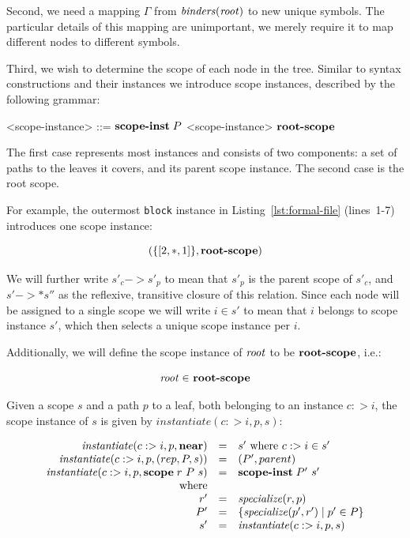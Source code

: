 \documentclass{kththesis}
\begin{document}
Second, we need a mapping $\Gamma$ from $\mathit{binders}(\mathit{root})$ to new unique symbols. The particular details of this mapping are unimportant, we merely require it to map different nodes to different symbols.

Third, we wish to determine the scope of each node in the tree. Similar to syntax constructions and their instances we introduce scope instances, described by the following grammar:

\newcommand{\rootscope}{\ensuremath{\mathrel{\text{\textbf{root-scope}}}}}
\newcommand{\scopeinst}{\mathrel{\text{\textbf{scope-inst}}}}

\begin{grammar}
<scope-instance> ::= $\scopeinst P$ <scope-instance>
  \alt \rootscope
\end{grammar}

The first case represents most instances and consists of two components: a set of paths to the leaves it covers, and its parent scope instance. The second case is the root scope.

For example, the outermost \texttt{block} instance in Listing~\ref{lst:formal-file} (lines~1-7) introduces one scope instance:

$$
(\{[2, *, 1]\}, \rootscope)
$$

We will further write $s'_c -> s'_p$ to mean that $s'_p$ is the parent scope of $s'_c$, and $s' ->* s''$ as the reflexive, transitive closure of this relation. Since each node will be assigned to a single scope we will write $i \in s'$ to mean that $i$ belongs to scope instance $s'$, which then selects a unique scope instance per $i$.

Additionally, we will define the scope instance of $\mathit{root}$ to be $\rootscope$, i.e.:

$$ \rooti \in\ \rootscope $$

\newcommand{\instantiate}{\ensuremath{\mathit{instantiate}}}

Given a scope $s$ and a path $p$ to a leaf, both belonging to an instance $c :> i$, the scope instance of $s$ is given by $\instantiate(c :> i, p, s)$:

$$
\begin{array}{rcl}
\instantiate(c :> i, p, \near) & = & s' \text{ where } c :> i \in s' \\
\instantiate(c :> i, p, \text{(}rep, P, s\text{)}) & = & \text{(}P', parent\text{)} \\
\instantiate(c :> i, p, \scope r\ P\ s) & = & \scopeinst P'\ s' \\
\text{where} & & \\
r' & = & \specialize(r, p) \\
P' & = & \{\specialize(p', r') \mid p' \in P\} \\
s' & = & \instantiate(c :> i, p, s) \\
\end{array}
$$
\end{document}

